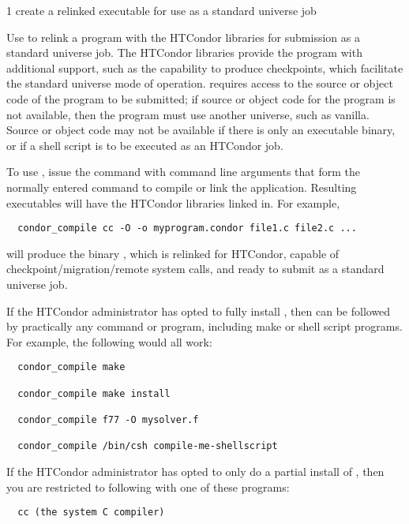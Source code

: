 \begin{ManPage}{\label{man-condor-compile}}{1}
{create a relinked executable for use as a standard universe job}

\Synopsis {}

\Description


Use  to relink a program with the HTCondor libraries for
submission as a standard universe job.
The HTCondor libraries provide the program with additional support, such
as the capability to produce checkpoints, 
which facilitate the standard universe mode of operation.
 requires access to the source or object code of the
program to be submitted; if source or object code for the program is
not available,
then the program must use another universe, such as vanilla.
Source or object code may not be available if there is 
only an executable binary, or if a shell script is to be executed as
an HTCondor job. 

To use , issue the command
 with command line arguments that form
the normally entered command to compile or link the application.
Resulting executables will have the HTCondor libraries linked in.
For example, 
\footnotesize
\begin{verbatim}
  condor_compile cc -O -o myprogram.condor file1.c file2.c ... 
\end{verbatim}
\normalsize
will produce the binary , 
which is relinked for HTCondor,
capable of checkpoint/migration/remote system calls, and ready to
submit as a standard universe job.  

If the HTCondor administrator has opted to fully install
, then  can be followed by practically
any command or program, including make or shell script programs.
For example, the following would all work:
\footnotesize
\begin{verbatim}
  condor_compile make 

  condor_compile make install 

  condor_compile f77 -O mysolver.f 

  condor_compile /bin/csh compile-me-shellscript 
\end{verbatim}
\normalsize

If the HTCondor administrator has opted to only do a partial install of
, then you are restricted to following 
with one of these programs:  
\footnotesize
\begin{verbatim}
  cc (the system C compiler) 


\end{verbatim}
\end{ManPage}
